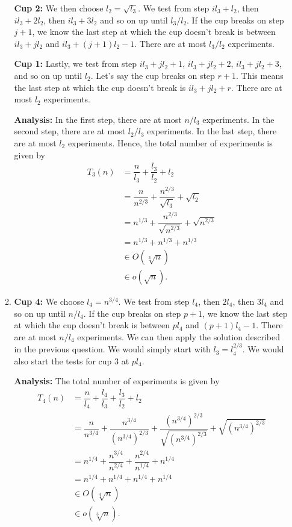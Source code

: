 \documentclass[11pt, letterpaper, titlepage]{article}
\begin{document}
\begin{enumerate}[label=\alph*.]
\begin{enumerate}[label=(\roman*)]
        \textbf{Cup 2:} We then choose $l_2 = \sqrt{l_3}$. We test from step $il_3 + l_2$, then $il_3 + 2l_2$, then $il_3 + 3l_2$ and so on up until $l_3 / l_2$. If the cup breaks on step $j + 1$, we know the last step at which the cup doesn't break is between $il_3 + jl_2$ and $il_3 + (j+1)l_2 - 1$. There are at most $l_3 / l_2$ experiments. 

        \textbf{Cup 1:} Lastly, we test from step $il_3 + jl_2 + 1$, $il_3 + jl_2 + 2$, $il_3 + jl_2 + 3$, and so on up until $l_2$. Let's say the cup breaks on step $r + 1$. This means the last step at which the cup doesn't break is $il_3 + jl_2 + r$. There are at most $l_2$ experiments.

        \textbf{Analysis:} In the first step, there are at most $n / l_3$ experiments. In the second step, there are at most $l_2 / l_3$ experiments. In the last step, there are at most $l_2$ experiments. Hence, the total number of experiments is given by
        \begin{align}
            T_3(n) &= \dfrac{n}{l_3} + \dfrac{l_3}{l_2} + l_2 \\
            &= \dfrac{n}{n^{2/3}} + \dfrac{n^{2/3}}{\sqrt{l_3}} + \sqrt{l_2} \\
            &= n^{1/3} + \dfrac{n^{2/3}}{\sqrt{n^{2/3}}} + \sqrt{n^{2/3}} \\
            &= n^{1/3} + n^{1/3} + n^{1/3} \\
            &\in O(\sqrt[3]{n}) \\
            &\in o(\sqrt{n}).
        \end{align}

        \item \textbf{Cup 4:} We choose $l_4 = n^{3/4}$. We test from step $l_4$, then $2l_4$, then $3l_4$ and so on up until $n / l_4$. If the cup breaks on step $p + 1$, we know the last step at which the cup doesn't break is between $pl_4$ and $(p+1)l_4 - 1$. There are at most $n / l_4$ experiments. We can then apply the solution described in the previous question. We would simply start with $l_3 = l_4^{2/3}$. We would also start the tests for cup 3 at $pl_4$.
        
        \textbf{Analysis:} The total number of experiments is given by
        \begin{align}
            T_4(n) &= \dfrac{n}{l_4} + \dfrac{l_4}{l_3} + \dfrac{l_3}{l_2} + l_2 \\
            &= \dfrac{n}{n^{3/4}} + \dfrac{n^{3/4}}{(n^{3/4})^{2/3}} + \dfrac{(n^{3/4})^{2/3}}{\sqrt{(n^{3/4})^{2/3}}} + \sqrt{(n^{3/4})^{2/3}} \\
            &= n^{1/4} + \dfrac{n^{3/4}}{n^{2/4}} + \dfrac{n^{2/4}}{n^{1/4}} + n^{1/4} \\
            &= n^{1/4} + n^{1/4} + n^{1/4} + n^{1/4} \\
            &\in O(\sqrt[4]{n}) \\
            &\in o(\sqrt[3]{n}).
        \end{align}
    \end{enumerate}
\end{enumerate}
\end{document}
